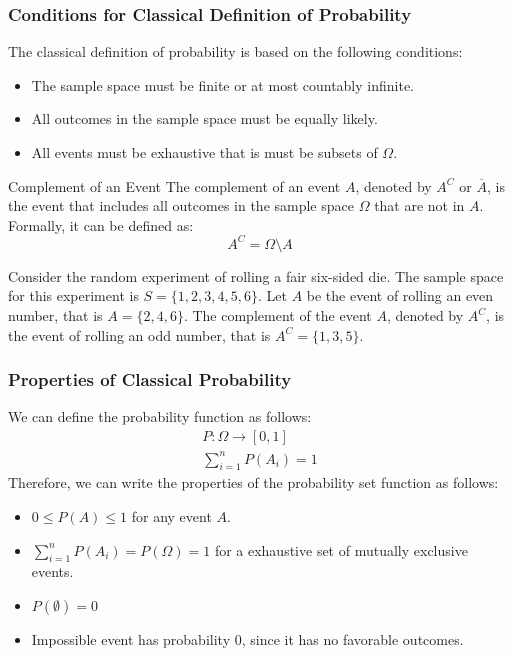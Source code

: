 \documentclass[openany]{book}
\begin{document}
\subsubsection{Conditions for Classical Definition of Probability}
The classical definition of probability is based on the following conditions:
\begin{itemize}
    \item The sample space must be finite or at most countably infinite.
    \item All outcomes in the sample space must be equally likely.
    \item All events must be exhaustive that is must be subsets of $\Omega$.
\end{itemize}
\begin{mydefinition}{Complement of an Event}
The complement of an event $A$, denoted by $A^C$ or $\overline{A}$, is the event that includes all outcomes in the sample space $\Omega$ that are not in $A$. Formally, it can be defined as:
$$A^C = \Omega \setminus A$$
\end{mydefinition}
\begin{example}
    Consider the random experiment of rolling a fair six-sided die. The sample space for this experiment is $S = \{1, 2, 3, 4, 5, 6\}$. Let $A$ be the event of rolling an even number, that is $A = \{2, 4, 6\}$. The complement of the event $A$, denoted by $A^C$, is the event of rolling an odd number, that is $A^C = \{1, 3, 5\}$.
\end{example}
\subsubsection{Properties of Classical Probability}
We can define the probability function as follows: 
\begin{align*}
P: \Omega \to [0, 1] \\ \sum_{i=1}^{n} P(A_i) = 1
\end{align*}
Therefore, we can write the properties of the probability set function as follows:
\begin{itemize}
\item $0 \leq P(A) \leq 1$ for any event $A$.
\item $\sum_{i=1}^{n} P(A_i) = P(\Omega) =1$ for a exhaustive set of mutually exclusive events.
\item $P(\emptyset) = 0$
\item Impossible event has probability 0, since it has no favorable outcomes.
\end{itemize}
\end{document}

